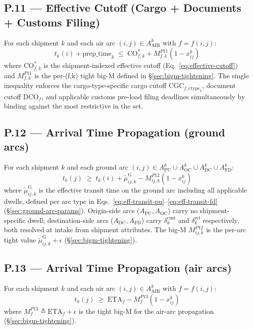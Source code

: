 \documentclass[11pt,a4paper]{article}
\newcommand{\defeq}{\triangleq}
\newcommand{\ctype}{\text{ctype}}
\theoremstyle{definition}
\begin{document}
\subsection*{P.11 — Effective Cutoff (Cargo + Documents + Customs Filing)}

For each shipment $k$ and each air arc $(i,j) \in A^k_{\text{AIR}}$ with $f = f(i,j)$:
\begin{equation}
  t_k(i) + \text{prep\_time}_k \;\leq\; \text{CO}_{f,k}^* + M^{P11}_{f,k}(1 - x_{ij}^k)
  \label{eq:P11}
\end{equation}
where $\text{CO}_{f,k}^*$ is the shipment-indexed effective cutoff
(Eq.~\ref{eq:effective-cutoff}) and $M^{P11}_{f,k}$ is the per-(f,k) tight big-M
defined in \S\ref{sec:bigm-tightening}. The single inequality enforces
the cargo-type-specific cargo cutoff $\text{CGC}_{f,\ctype_k}$, document cutoff
$\text{DCO}_f$, and applicable customs pre-load filing deadlines simultaneously by
binding against the most restrictive in the set.

\subsection*{P.12 — Arrival Time Propagation (ground arcs)}

For each shipment $k$ and each ground arc $(i,j) \in A^k_{\text{PU}} \cup A^k_{\text{OC}} \cup A^k_{\text{DC}} \cup A^k_{\text{FD}}$:
\begin{equation}
  t_k(j) \;\geq\; t_k(i) + \tilde{\mu}_{ij,k}^{\text{G}} - M^{P12}_{ij,k}(1 - x_{ij}^k)
  \label{eq:P12}
\end{equation}
where $\tilde{\mu}_{ij,k}^{\text{G}}$ is the effective transit time on the ground arc
including all applicable dwells, defined per arc type in
Eqs.~\ref{eq:eff-transit-pu}--\ref{eq:eff-transit-fd}
(\S\ref{sec:ground-arc-params}). Origin-side arcs ($A_{\text{PU}}, A_{\text{OC}}$) carry
no shipment-specific dwell; destination-side arcs ($A_{\text{DC}}, A_{\text{FD}}$) carry
$\delta^{\text{cust}}_k$ and $\delta^{\text{rel}}_k$ respectively, both resolved at
intake from shipment attributes. The big-M $M^{P12}_{ij,k}$ is the per-arc tight value
$\tilde{\mu}_{ij,k}^{\text{G}} + \epsilon$ (\S\ref{sec:bigm-tightening}).

\subsection*{P.13 — Arrival Time Propagation (air arcs)}

For each shipment $k$ and each air arc $(i,j) \in A^k_{\text{AIR}}$ with $f = f(i,j)$:
\begin{equation}
  t_k(j) \;\geq\; \text{ETA}_f - M^{P13}_f(1 - x_{ij}^k)
  \label{eq:P13}
\end{equation}
where $M^{P13}_f \defeq \text{ETA}_f + \epsilon$ is the tight big-M for the air-arc
propagation (\S\ref{sec:bigm-tightening}).
\end{document}
